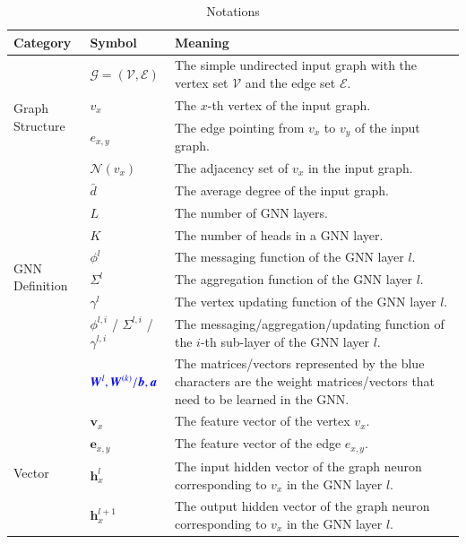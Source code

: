 \begin{table}[h]
    \caption{Notations}
    \label{tab:notations}
    \centering
    \small
    \begin{tabular}{p{3em}lp{35em}}
        \toprule
       Category & Symbol & Meaning \\
        \midrule
        \multirow[c]{4}{3em}{Graph Structure}& $\mathcal{G}=(\mathcal{V}, \mathcal{E})$ & The simple undirected input graph with the vertex set $\mathcal{V}$ and the edge set $\mathcal{E}$. \\
        & $v_x$ & The $x$-th vertex of the input graph. \\
        & $e_{x,y}$ & The edge pointing from $v_x$ to $v_y$ of the input graph. \\
        & $\mathcal{N}(v_x)$ & The adjacency set of $v_x$ in the input graph. \\ 
        & $\bar{d}$ & The average degree of the input graph. \\ \midrule
        \multirow[c]{6}{3em}{GNN Definition}& $L$ & The number of GNN layers. \\
        & $K$ & The number of heads in a GNN layer. \\
        & $\phi^l$ & The messaging function of the GNN layer $l$. \\
        & $\Sigma^l$ & The aggregation function of the GNN layer $l$. \\
        & $\gamma^l$ & The vertex updating function of the GNN layer $l$. \\ 
        & $\phi^{l,i}$ / $\Sigma^{l,i}$ / $\gamma^{l,i}$ & The messaging/aggregation/updating function of the $i$-th sub-layer of the GNN layer  $l$.\\
        & $\textcolor{blue}{\boldsymbol{W}^l, \boldsymbol{W}^{(k)}/\boldsymbol{b}, \boldsymbol{a}}$ & The matrices/vectors represented by the blue characters are the weight matrices/vectors that need to be learned in the GNN. \\  \midrule
        \multirow[c]{8}{3em}{Vector}& $\boldsymbol{v}_x$ & The feature vector of the vertex $v_x$. \\
        & $\boldsymbol{e}_{x,y}$ & The feature vector of the edge $e_{x,y}$.  \\
        & $\boldsymbol{h}_x^{l}$ &  The {input} hidden vector of the graph neuron corresponding to $v_x$ in the GNN layer $l$. \\
        & $\boldsymbol{h}_x^{l+1}$ &  The {output} hidden vector of the graph neuron corresponding to $v_x$ in the GNN layer $l$.\\

\end{tabular}
\end{table}
